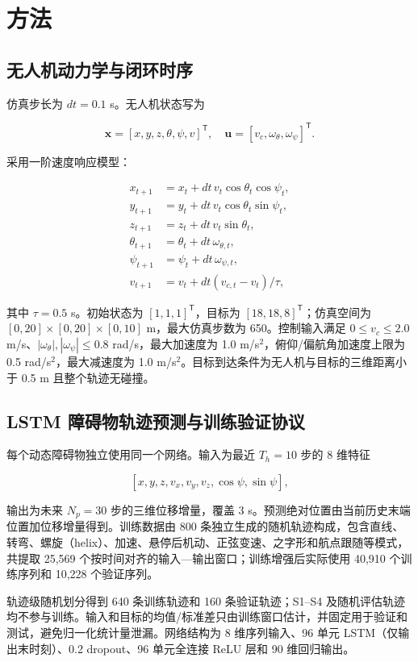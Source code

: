 \documentclass[10pt,a4paper,twocolumn]{ctexart}
\begin{document}
\section{方法}

\subsection{无人机动力学与闭环时序}

仿真步长为 $dt=0.1$ s。无人机状态写为

\[
\mathbf{x}=[x,y,z,\theta,\psi,v]^\mathsf{T},\quad
\mathbf{u}=[v_c,\omega_\theta,\omega_\psi]^\mathsf{T}.
\]

采用一阶速度响应模型：

\[
\begin{aligned}
x_{t+1}&=x_t+dt\,v_t\cos\theta_t\cos\psi_t,\\
y_{t+1}&=y_t+dt\,v_t\cos\theta_t\sin\psi_t,\\
z_{t+1}&=z_t+dt\,v_t\sin\theta_t,\\
\theta_{t+1}&=\theta_t+dt\,\omega_{\theta,t},\\
\psi_{t+1}&=\psi_t+dt\,\omega_{\psi,t},\\
v_{t+1}&=v_t+dt(v_{c,t}-v_t)/\tau,
\end{aligned}
\]

其中 $\tau=0.5$ s。初始状态为 $[1,1,1]^{\mathsf T}$，目标为 $[18,18,8]^{\mathsf T}$；仿真空间为 $[0,20]\times[0,20]\times[0,10]$ m，最大仿真步数为 650。控制输入满足 $0\leq v_c\leq2.0$ m/s、$|\omega_\theta|,|\omega_\psi|\leq0.8$ rad/s，最大加速度为 1.0 m/s$^2$，俯仰/偏航角加速度上限为 0.5 rad/s$^2$，最大减速度为 1.0 m/s$^2$。目标到达条件为无人机与目标的三维距离小于 0.5 m 且整个轨迹无碰撞。

\subsection{LSTM 障碍物轨迹预测与训练验证协议}

每个动态障碍物独立使用同一个网络。输入为最近 $T_h=10$ 步的 8 维特征

\[
[x,y,z,v_x,v_y,v_z,\cos\psi,\sin\psi],
\]

输出为未来 $N_p=30$ 步的三维位移增量，覆盖 3 s。预测绝对位置由当前历史末端位置加位移增量得到。训练数据由 800 条独立生成的随机轨迹构成，包含直线、转弯、螺旋（helix）、加速、悬停后机动、正弦变速、之字形和航点跟随等模式，共提取 25,569 个按时间对齐的输入—输出窗口；训练增强后实际使用 40,910 个训练序列和 10,228 个验证序列。

轨迹级随机划分得到 640 条训练轨迹和 160 条验证轨迹；S1–S4 及随机评估轨迹均不参与训练。输入和目标的均值/标准差只由训练窗口估计，并固定用于验证和测试，避免归一化统计量泄漏。网络结构为 8 维序列输入、96 单元 LSTM（仅输出末时刻）、0.2 dropout、96 单元全连接 ReLU 层和 90 维回归输出。
\end{document}
